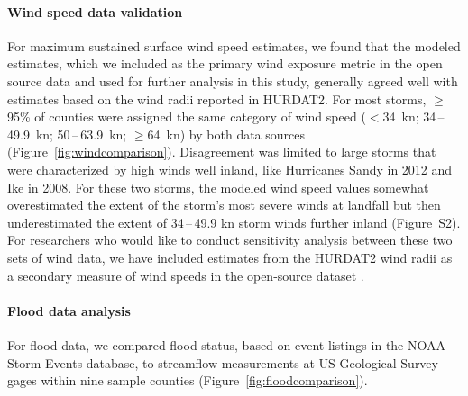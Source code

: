 \paragraph{Wind speed data validation}

For maximum sustained surface wind speed estimates, we found that the modeled
estimates, which we included as the primary wind exposure metric in the open
source data and used for further analysis in this study, generally agreed well
with estimates based on the wind radii reported in \ac{HURDAT2}. For most
storms, $\ge$95\% of counties were assigned the same category of wind speed
($<$34~\si{\knot}; 34\,--\,49.9~\si{\knot}; 50\,--\,63.9~\si{\knot};
$\ge$64~\si{\knot}) by both data sources (Figure~\ref{fig:windcomparison}).
Disagreement was limited to large storms that were characterized by high winds
well inland, like Hurricanes Sandy in 2012 and Ike in 2008. For these two
storms, the modeled wind speed values somewhat overestimated the extent of the
storm's most severe winds at landfall but then underestimated the extent of
34\,--\,49.9 \si{\knot} storm winds further inland (Figure~S2). For researchers
who would like to conduct sensitivity analysis between these two sets of wind
data, we have included estimates from the \ac{HURDAT2} wind radii as a
secondary measure of wind speeds in the open-source dataset
\parencite{hurricaneexposuredata}.

\paragraph{Flood data analysis}

For flood data, we compared flood status, based on event listings in the NOAA
Storm Events database, to streamflow measurements at \ac{US} Geological Survey
gages within nine sample counties (Figure~\ref{fig:floodcomparison}).   

